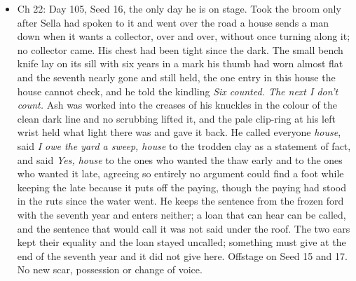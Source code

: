 \documentclass{design/chronicle}
\begin{document}
{\begin{itemize}[leftmargin=1.4em,itemsep=1pt,topsep=3pt,parsep=0pt]
\item Ch 22: Day 105, Seed 16, the only day he is on stage. Took the broom only after Sella had spoken to it and went over the road a house sends a man down when it wants a collector, over and over, without once turning along it; no collector came. His chest had been tight since the dark. The small bench knife lay on its sill with six years in a mark his thumb had worn almost flat and the seventh nearly gone and still held, the one entry in this house the house cannot check, and he told the kindling \emph{Six counted. The next I don’t count.} Ash was worked into the creases of his knuckles in the colour of the clean dark line and no scrubbing lifted it, and the pale clip-ring at his left wrist held what light there was and gave it back. He called everyone \emph{house}, said \emph{I owe the yard a sweep, house} to the trodden clay as a statement of fact, and said \emph{Yes, house} to the ones who wanted the thaw early and to the ones who wanted it late, agreeing so entirely no argument could find a foot while keeping the late because it puts off the paying, though the paying had stood in the ruts since the water went. He keeps the sentence from the frozen ford with the seventh year and enters neither; a loan that can hear can be called, and the sentence that would call it was not said under the roof. The two ears kept their equality and the loan stayed uncalled; something must give at the end of the seventh year and it did not give here. Offstage on Seed 15 and 17. No new scar, possession or change of voice.

\end{itemize}

\begin{itemize}[leftmargin=1.4em,itemsep=1pt,topsep=3pt,parsep=0pt]


\end{itemize}}
\end{document}

